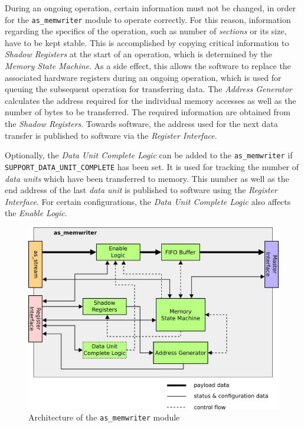 During an ongoing operation, certain information must not be changed, in order for the \texttt{as\_memwriter} module to operate correctly. 
For this reason, information regarding the specifics of the operation, such as number of \textit{sections} or its size, have to be kept stable. 
This is accomplished by copying critical information to \textit{Shadow Registers} at the start of an operation, which is determined by the \textit{Memory State Machine}. 
As a side effect, this allows the software to replace the associated hardware registers during an ongoing operation, which is used for queuing the subsequent operation for transferring data. 
The \textit{Address Generator} calculates the address required for the individual memory accesses as well as the number of bytes to be transferred. 
The required information are obtained from the \textit{Shadow Registers}. 
Towards software, the address used for the next data transfer is published to software via the \textit{Register Interface}.

Optionally, the \textit{Data Unit Complete Logic} can be added to the \texttt{as\_memwriter} if \texttt{SUPPORT\_DATA\_UNIT\_COMPLETE} has been set.
It is used for tracking the number of \textit{data units} which have been transferred to memory.
This number as well as the end address of the last \textit{data unit} is published to software using the \textit{Register Interface}.
For certain configurations, the \textit{Data Unit Complete Logic} also affects the \textit{Enable Logic}.


\begin{figure}[ht]
    \centering
    \includegraphics[width=0.8\linewidth,clip]{figs/memwriter.png}
    \caption{Architecture of the \texttt{as\_memwriter} module}
    \label{fig:memwriter}
\end{figure}

